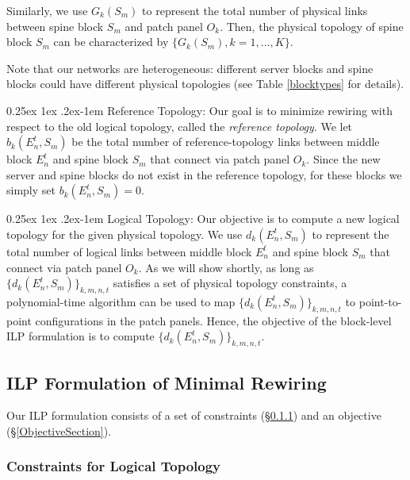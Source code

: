\documentclass[letterpaper,twocolumn,10pt]{article}
\makeatletter
\renewcommand{\paragraph}{%
  \@startsection{paragraph}{4}%
  {\z@}{0.25ex \@plus 1ex \@minus .2ex}{-1em}%
  {\normalfont\normalsize\bfseries}%
}
\makeatother
\begin{document}
Similarly, we use $G_k(S_m)$ to represent the total number of physical links between spine block $S_m$ and patch panel $O_k$. Then, the physical topology of spine block $S_m$ can be characterized by $\{G_k(S_m), k=1,...,K\}$. 

Note that our networks are heterogeneous: different server blocks and spine blocks could have different physical topologies (see Table \ref{blocktypes} for details).

\paragraph{Reference Topology:} Our goal is to minimize rewiring with respect to the old logical topology, called the \emph{reference topology}. We let $b_k(E_n^t, S_m)$ be the total number of reference-topology links between middle block $E_n^t$ and spine block $S_m$ that connect via patch panel $O_k$. Since the new server and spine blocks do not exist in the reference topology, for these blocks we simply set $b_k(E_n^t, S_m) = 0$.

\paragraph{Logical Topology:} Our objective is to compute a new logical topology for the given physical topology. We use $d_k(E_n^t, S_m)$ to represent the total number of logical links between middle block $E_n^t$ and spine block $S_m$ that connect via patch panel $O_k$. As we will show shortly, as long as $\{d_k(E_n^t, S_m)\}_{k,m,n,t}$ satisfies a set of physical topology constraints, a polynomial-time algorithm can be used to map  $\{d_k(E_n^t, S_m)\}_{k,m,n,t}$ to point-to-point configurations in the patch panels. Hence, the objective of the block-level ILP formulation is to compute $\{d_k(E_n^t, S_m)\}_{k,m,n,t}$.


\subsection{ILP Formulation of Minimal Rewiring}\label{ILPSection}

Our ILP formulation consists of a set of constraints (\S\ref{ConstraintsSection}) and an objective (\S\ref{ObjectiveSection}).

\subsubsection{Constraints for Logical Topology}\label{ConstraintsSection}
\end{document}
